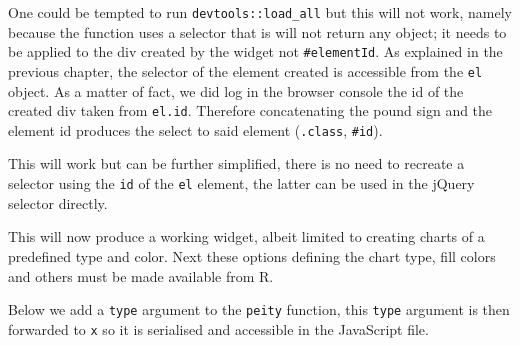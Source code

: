 \documentclass[
]{krantz}
\makeatletter
\newenvironment{Shaded}{\begin{snugshade}}{\end{snugshade}}
\newcommand{\AttributeTok}[1]{\textcolor[rgb]{0.61,0.61,0.61}{#1}}
\newcommand{\DataTypeTok}[1]{\textcolor[rgb]{0.27,0.27,0.27}{#1}}
\newcommand{\NormalTok}[1]{#1}
\newcommand{\OperatorTok}[1]{\textcolor[rgb]{0.43,0.43,0.43}{\textbf{#1}}}
\newcommand{\StringTok}[1]{\textcolor[rgb]{0.5,0.5,0.5}{#1}}
\newcommand{\VariableTok}[1]{\textcolor[rgb]{0,0,0}{#1}}
\newenvironment{kframe}{%
\medskip{}
\setlength{\fboxsep}{.8em}
 \def\at@end@of@kframe{}%
 \ifinner\ifhmode%
  \def\at@end@of@kframe{\end{minipage}}%
  \begin{minipage}{\columnwidth}%
 \fi\fi%
 \def\FrameCommand##1{\hskip\@totalleftmargin \hskip-\fboxsep
 \colorbox{shadecolor}{##1}\hskip-\fboxsep
     \hskip-\linewidth \hskip-\@totalleftmargin \hskip\columnwidth}%
 \MakeFramed {\advance\hsize-\width
   \@totalleftmargin\z@ \linewidth\hsize
   \@setminipage}}%
 {\par\unskip\endMakeFramed%
 \at@end@of@kframe}
\renewenvironment{Shaded}{\begin{kframe}}{\end{kframe}}
\makeatother
\begin{document}
One could be tempted to run \texttt{devtools::load\_all} but this will not work, namely because the function uses a selector that is will not return any object; it needs to be applied to the div created by the widget not \texttt{\#elementId}. As explained in the previous chapter, the selector of the element created is accessible from the \texttt{el} object. As a matter of fact, we did log in the browser console the id of the created div taken from \texttt{el.id}. Therefore concatenating the pound sign and the element id produces the select to said element (\texttt{.class}, \texttt{\#id}).

\begin{Shaded}
\end{Shaded}

This will work but can be further simplified, there is no need to recreate a selector using the \texttt{id} of the \texttt{el} element, the latter can be used in the jQuery selector directly.

\begin{Shaded}
\end{Shaded}

This will now produce a working widget, albeit limited to creating charts of a predefined type and color. Next these options defining the chart type, fill colors and others must be made available from R.

Below we add a \texttt{type} argument to the \texttt{peity} function, this \texttt{type} argument is then forwarded to \texttt{x} so it is serialised and accessible in the JavaScript file.
\end{document}
